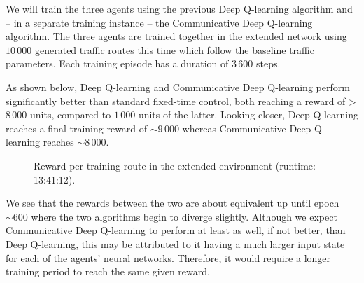 \documentclass[a4paper]{report}
\begin{document}
We will train the three agents using the previous Deep Q-learning algorithm and -- in a separate training instance -- the Communicative Deep Q-learning algorithm. The three agents are trained together in the extended network using $10\,000$ generated traffic routes this time which follow the baseline traffic parameters. Each training episode has a duration of $3\,600$ steps.

As shown below, Deep Q-learning and Communicative Deep Q-learning perform significantly better than standard fixed-time control, both reaching a reward of \textgreater $8\,000$ units, compared to $1\,000$ units of the latter. Looking closer, Deep Q-learning reaches a final training reward of $\sim9\,000$ whereas Communicative Deep Q-learning reaches $\sim8\,000$.

\begin{figure}[H]
  \centering
  \caption{Reward per training route in the extended environment (runtime: 13:41:12).}
  \label{fig:communicative_deep_q_learning_extended_train}
\end{figure}

We see that the rewards between the two are about equivalent up until epoch $\sim600$ where the two algorithms begin to diverge slightly. Although we expect Communicative Deep Q-learning to perform at least as well, if not better, than Deep Q-learning, this may be attributed to it having a much larger input state for each of the agents' neural networks. Therefore, it would require a longer training period to reach the same given reward.
\end{document}
